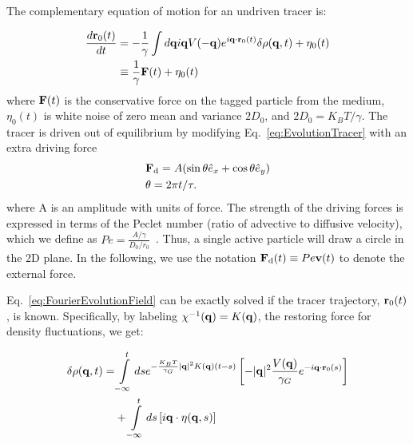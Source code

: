 \documentclass[pre,amsmath,preprintnumbers,10pt,article,notitlepage,twocolumn]{revtex4-1}
\begin{document}

The complementary equation of motion for an undriven tracer is:

\begin{equation}
\begin{split}
\dfrac{d{\bf r}_0(t)}{d t} & = -\dfrac{1}{\gamma} \int  d{\bf q} i {\bf q} V(-{\bf q})e^{i{\bf q} \cdot {\bf r}_0(t)} \delta \rho({\bf q}, t) +  \eta_0(t)\\
&\equiv \frac{1}{\gamma} {\bf F}(t) + \eta_0(t) 
\end{split}
\label{eq:EvolutionTracer}
\end{equation}
where  ${\bf F}(t)$ is the conservative force on the tagged particle from the medium, $\eta_0(t)$ is white noise of zero mean and variance $2D_0$, and $2D_0 ={K_BT}/{\gamma}$. The tracer is driven out of equilibrium by modifying Eq.~\ref{eq:EvolutionTracer} with an extra driving force 
\begin{align}
&{\bf F}_{\rm d} =A(\sin\theta \hat e_x+\cos\theta\hat e_y) \label{eq:FexEq} \\
&\theta=2\pi t/\tau. \label{eq:theta}
\end{align}
where A is an amplitude with units of force. The strength of the driving forces is expressed in terms of the Peclet number (ratio of advective to diffusive velocity), which we define as $Pe = \frac{A/\gamma}{D_0/r_0}$~\cite{delJunco2018,Han2016}. Thus, a single active particle will draw a circle in the 2D plane. In the following, we use the notation ${\bf F}_{\rm d}(t) \equiv Pe {\bf v} (t)$ to denote the external force. 

Eq.~\ref{eq:FourierEvolutionField} can be exactly solved if the tracer trajectory, ${\bf r}_0(t)$, is known. Specifically, by labeling $\chi^{-1}({\bf q}) = K({\bf q})$, the restoring force for density fluctuations, we get:

\begin{equation}
\begin{split}
\delta\rho({\bf q},t)=
&\int\limits_{-\infty}^t ds  e^{-\frac{K_BT}{\gamma_G}|{\bf q}|^2 K({\bf q})(t-s)}\left[-|{\bf q}|^2 \dfrac{V({\bf q})}{\gamma_G} e^{-i {\bf q}\cdot {\bf r}_0(s)}\right] \\ & +\int\limits_{-\infty}^t ds \left[ i{\bf q} \cdot \eta({\bf q},s)\right] 
\end{split}
\label{eq:SolutionFourierEvolution}
\end{equation}
\end{document}
